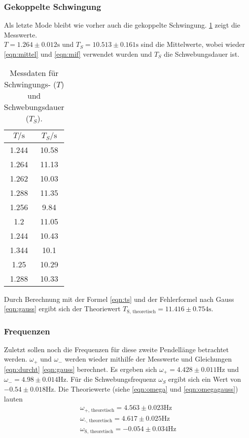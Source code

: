 \subsubsection{Gekoppelte Schwingung}
Als letzte Mode bleibt wie vorher auch die gekoppelte Schwingung. \ref{tab:gek2} zeigt die Messwerte. \\
$T = 1.264\pm 0.012\si{\s}$ und $T_{S} = 10.513\pm 0.161\si{\s}$ sind die Mittelwerte, wobei wieder \eqref{eqn:mittel} und \eqref{eqn:mif} verwendet wurden und 
$T_{S}$ die Schwebungsdauer ist.
\begin{table}
    \centering
    \caption{Messdaten für Schwingungs- ($T$) und Schwebungsdauer ($T_{S}$).}
    \label{tab:gek2}
    \begin{tabular}{c c}
     \toprule
     $T / \si{\s}$ & $T_{S} / \si{\s}$\\
     \midrule
     1.244 & 10.58\\
     1.264 & 11.13\\
     1.262 & 10.03\\
     1.288 & 11.35\\
     1.256 & 9.84\\
     1.2 & 11.05\\
     1.244 & 10.43\\
     1.344 & 10.1\\
     1.25 & 10.29\\
     1.288 & 10.33\\
     \bottomrule
    \end{tabular}
\end{table}
Durch Berechnung mit der Formel \eqref{eqn:ts} und der Fehlerformel nach Gauss \eqref{eqn:gauss} ergibt sich der Theoriewert $T_\text{S, theoretisch} = 11.416\pm 0.754\si{\s}$.

\subsubsection{Frequenzen}
Zuletzt sollen noch die Frequenzen für diese zweite Pendellänge betrachtet werden.
$\omega_{+}$ und $\omega_{-}$ werden wieder mithilfe der Messwerte und Gleichungen \eqref{eqn:durcht} \eqref{eqn:gauss}
berechnet. Es ergeben sich $\omega_{+} = 4.428\pm 0.011\si{\Hz}$ und $\omega_{-} = 4.98\pm 0.014\si{\Hz}$. Für die Schwebungsfrequenz $\omega_{S}$ ergibt sich 
ein Wert von $-0.54 \pm 0.018\si{\Hz}$.
Die Theoriewerte (siehe \eqref{eqn:omega} und \eqref{eqn:omegagauss}) lauten
\begin{align*}
\omega_\text{+, theoretisch} = 4.563 \pm 0.023\si{\Hz}\\
\omega_\text{-, theoretisch} = 4.617 \pm 0.025\si{\Hz}\\
\omega_\text{S, theoretisch} = -0.054 \pm 0.034\si{\Hz}
\end{align*}